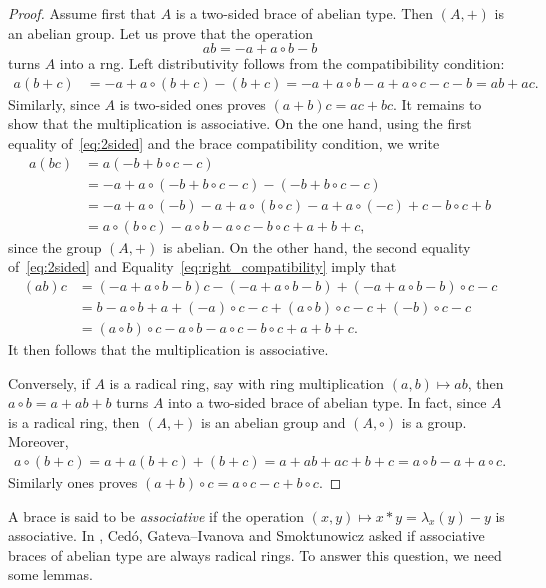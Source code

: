 \begin{proof}
    Assume first that $A$ is a two-sided brace of abelian type. Then $(A,+)$ is an abelian group. 
    Let us prove that the operation
    \[
    ab=-a+a\circ b-b
    \]
    turns $A$ into a rng. Left distributivity follows from the compatibibility condition:
    \begin{align*}
    a(b+c)&=-a+a\circ (b+c)-(b+c)
    =-a+a\circ b-a+a\circ c-c-b=ab+ac.
    \end{align*}
    Similarly, since $A$ is two-sided ones proves $(a+b)c=ac+bc$. It remains to show that the multiplication
    is associative. On the one hand, using the first equality of~\eqref{eq:2sided} 
    and the brace compatibility condition, we write
    \begin{align*}
    a(bc)&=a(-b+b\circ c-c)\\
    &=-a+a\circ(-b+b\circ c-c)-(-b+b\circ c-c)\\
    &=-a+a\circ (-b)-a+a\circ(b\circ c)-a+a\circ (-c)+c-b\circ c+b\\
    &=a\circ (b\circ c)-a\circ b-a\circ c-b\circ c+a+b+c,
    \end{align*}
    since the group $(A,+)$ is abelian. On the other hand, the second equality of~\eqref{eq:2sided} and
    Equality~\eqref{eq:right_compatibility} imply that
    \begin{align*}
    (ab)c &= (-a+a\circ b-b)c-(-a+a\circ b-b)+(-a+a\circ b-b)\circ c-c\\
    &=b-a\circ b+a+(-a)\circ c-c+(a\circ b)\circ c-c+(-b)\circ c-c\\
    &=(a\circ b)\circ c-a\circ b-a\circ c-b\circ c+a+b+c.
    \end{align*}
    It then follows that the multiplication is associative. 
    
    Conversely, if $A$ is a radical ring, say with ring multiplication $(a,b)\mapsto ab$, 
    then $a\circ b=a+ab+b$ turns $A$ into a two-sided brace 
    of abelian type. In fact, since $A$ is a radical ring, then 
    $(A,+)$ is an abelian group and $(A,\circ)$ is a group. Moreover, 
    \begin{align*}
        a\circ (b+c)=a+a(b+c)+(b+c)=a+ab+ac+b+c=a\circ b-a+a\circ c.
    \end{align*}
    Similarly ones proves $(a+b)\circ c=a\circ c-c+b\circ c$.
\end{proof}

A brace is said to be \emph{associative} if the operation $(x,y)\mapsto
x*y=\lambda_x(y)-y$ is associative. In \cite[Question 2.1(2)]{MR3818285}, 
Cedó, Gateva--Ivanova and Smoktunowicz asked if associative braces of abelian type are always radical rings. 
To answer this question, we need some lemmas. 

